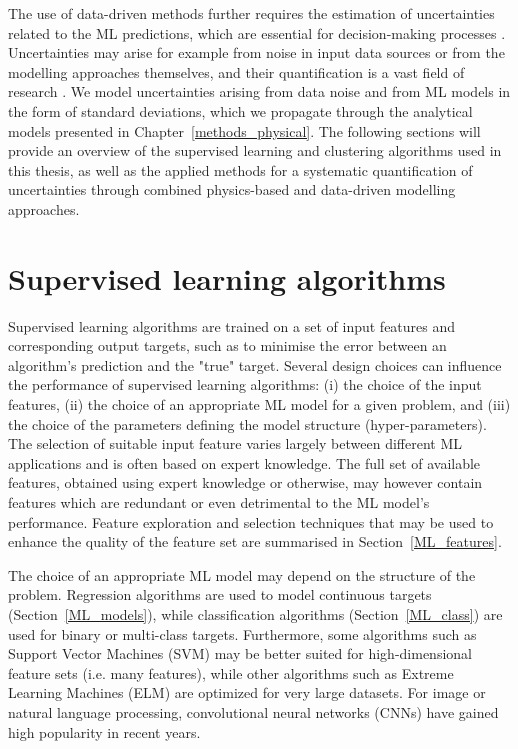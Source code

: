 The use of data-driven methods further requires the estimation of uncertainties related to the ML predictions, which are essential for decision-making processes \cite{knusel_argument-based_2020}. 
Uncertainties may arise for example from noise in input data sources or from the modelling approaches themselves, and their quantification is a vast field of research \cite{willard_integrating_2020,knusel_argument-based_2020}.
We model uncertainties arising from data noise and from ML models in the form of standard deviations, which we propagate through the analytical models presented in Chapter~\ref{methods_physical}. 
The following sections will provide an overview of the supervised learning and clustering algorithms used in this thesis, as well as the applied methods for a systematic quantification of uncertainties through combined physics-based and data-driven modelling approaches.

\section{Supervised learning algorithms}
\label{ML_supervised}

Supervised learning algorithms are trained on a set of input features and corresponding output targets, such as to minimise the error between an algorithm's prediction and the "true" target.
Several design choices can influence the performance of supervised learning algorithms: (i) the choice of the input features, (ii) the choice of an appropriate ML model for a given problem, and (iii) the
choice of the parameters defining the model structure (hyper-parameters).
The selection of suitable input feature varies largely between different ML applications and is often based on expert knowledge. 
The full set of available features, obtained using expert knowledge or otherwise, may however contain features which are redundant or even detrimental to the ML model's performance.
Feature exploration and selection techniques that may be used to enhance the quality of the feature set are summarised in Section~\ref{ML_features}.

The choice of an appropriate ML model may depend on the structure of the problem. Regression algorithms are used to model continuous targets (Section~\ref{ML_models}), while classification algorithms (Section~\ref{ML_class}) are used for binary or multi-class targets. Furthermore, some algorithms such as Support Vector Machines (SVM) may be better suited for high-dimensional feature sets (i.e. many features), while other algorithms such as Extreme Learning Machines (ELM) are optimized for very large datasets. For image or natural language processing, convolutional neural networks (CNNs) have gained high popularity in recent years.

